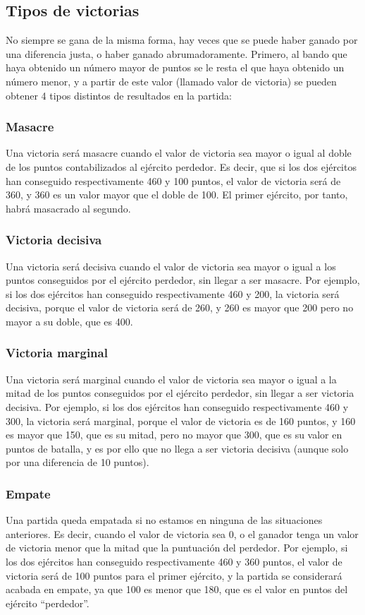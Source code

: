 \subsection*{Tipos de victorias}
\label{victorias}
No siempre se gana de la misma forma, hay veces que se puede haber
ganado por una diferencia justa, o haber ganado
abrumadoramente. Primero, al bando que haya obtenido un número mayor
de puntos se le resta el que haya obtenido un número menor, y a partir
de este valor (llamado valor de victoria) se pueden obtener 4 tipos
distintos de resultados en la partida:
\subsubsection*{Masacre}
Una victoria será masacre cuando el valor de victoria sea mayor o
igual al
doble de los puntos contabilizados al ejército perdedor. Es decir, que
si los dos ejércitos han conseguido respectivamente 460 y 100 puntos,
el valor de victoria será de 360, y 360 es un valor mayor que el doble
de 100. El primer ejército, por tanto, habrá masacrado al segundo.

\subsubsection*{Victoria decisiva}
Una victoria será decisiva cuando el valor de victoria sea mayor o
igual a los puntos conseguidos por el ejército perdedor, sin llegar a
ser masacre. Por ejemplo, si los dos ejércitos han conseguido
respectivamente 460 y 200, la victoria será decisiva, porque el valor
de victoria será de 260, y 260 es mayor que 200 pero no mayor a su
doble, que es 400.

\subsubsection*{Victoria marginal}
Una victoria será marginal cuando el valor de victoria sea mayor o
igual a la mitad de los puntos conseguidos por el ejército perdedor,
sin llegar a ser victoria decisiva. Por ejemplo, si los dos ejércitos
han conseguido respectivamente 460 y 300, la victoria será marginal,
porque el valor de victoria es de 160 puntos, y 160 es mayor que 150,
que es su mitad, pero no mayor que 300, que es su valor en puntos de
batalla, y es por ello que no llega a ser victoria decisiva (aunque solo por
una diferencia de 10 puntos).

\subsubsection*{Empate}
Una partida queda empatada si no estamos en ninguna de las situaciones
anteriores. Es decir, cuando el valor de victoria sea 0, o el ganador
tenga un valor de victoria menor que la mitad que la puntuación del
perdedor. Por ejemplo, si los dos ejércitos han conseguido
respectivamente 460 y 360 puntos, el valor de victoria será de 100
puntos para el primer ejército, y la partida se considerará acabada en
empate, ya que 100 es menor que 180, que es el valor en puntos del
ejército ``perdedor''.

